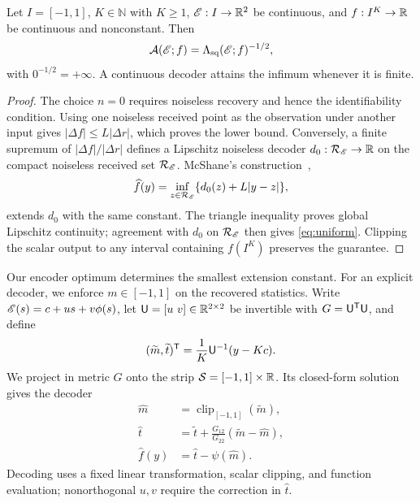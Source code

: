 \begin{proposition}\label{prop:amplification}
Let $I=[-1,1]$, $K\in\mathbb N$ with $K\ge1$, $\mathscr E:I\to\mathbb R^2$ be continuous, and $f:I^K\to\mathbb R$ be continuous and nonconstant. Then
$$\mathcal A(\mathscr E;f)=\Lambda_{\mathrm{sq}}(\mathscr E;f)^{-1/2},$$
with $0^{-1/2}=+\infty$. A continuous decoder attains the infimum whenever it is finite.
\end{proposition}
\begin{proof}
The choice $n=0$ requires noiseless recovery and hence the identifiability condition. Using one noiseless received point as the observation under another input gives $|\Delta f|\le L|\Delta r|$, which proves the lower bound. Conversely, a finite supremum of $|\Delta f|/|\Delta r|$ defines a Lipschitz noiseless decoder $d_0:\mathcal R_\mathscr E\to\mathbb R$ on the compact noiseless received set $\mathcal R_\mathscr E$. McShane's construction~\cite{mcshane1934},
$$\widehat f(y)=\inf_{z\in\mathcal R_\mathscr E}\{d_0(z)+L|y-z|\},$$
extends $d_0$ with the same constant. The triangle inequality proves global Lipschitz continuity; agreement with $d_0$ on $\mathcal R_\mathscr E$ then gives \eqref{eq:uniform}. Clipping the scalar output to any interval containing $f(I^K)$ preserves the guarantee.
\end{proof}
Our encoder optimum determines the smallest extension constant. For an explicit decoder, we enforce $m\in[-1,1]$ on the recovered statistics. Write $\mathscr E(s)=c+us+v\phi(s)$, let $\mathsf U=[u\ v]\in\mathbb R^{2\times2}$ be invertible with $G=\mathsf U^\mathsf T\mathsf U$, and define
$$
 (\widetilde m,\widetilde t)^\mathsf T=\frac1K \mathsf U^{-1}(y-Kc).
$$
We project in metric $G$ onto the strip $\mathcal S=[-1,1]\times\mathbb R$. Its closed-form solution gives the decoder
\begin{equation}\begin{aligned}
 \widehat m&=\operatorname{clip}_{[-1,1]}(\widetilde m),\\
 \widehat t&=\widetilde t+\frac{G_{12}}{G_{22}}(\widetilde m-\widehat m),\\
 \widehat f(y)&=\widehat t-\psi(\widehat m).
\end{aligned}\label{eq:stripdecoder}\end{equation}
Decoding uses a fixed linear transformation, scalar clipping, and function evaluation; nonorthogonal $u,v$ require the correction in $\widehat t$.

